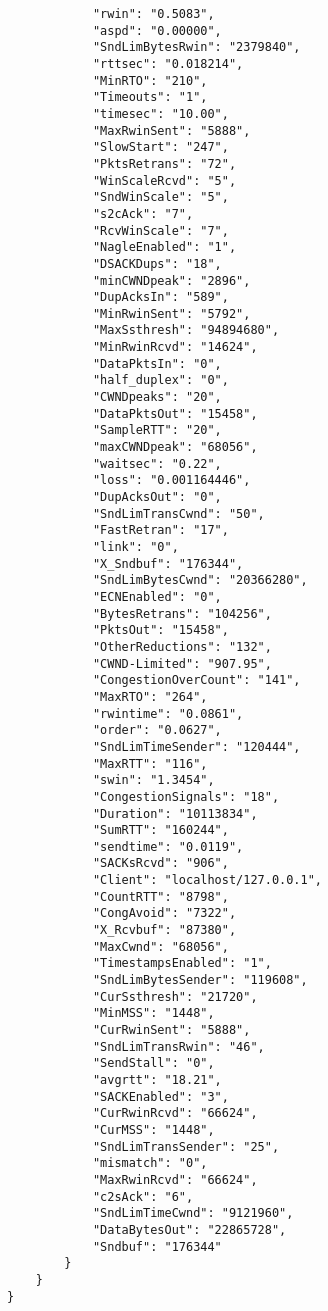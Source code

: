 \begin{verbatim}
            "rwin": "0.5083",
            "aspd": "0.00000",
            "SndLimBytesRwin": "2379840",
            "rttsec": "0.018214",
            "MinRTO": "210",
            "Timeouts": "1",
            "timesec": "10.00",
            "MaxRwinSent": "5888",
            "SlowStart": "247",
            "PktsRetrans": "72",
            "WinScaleRcvd": "5",
            "SndWinScale": "5",
            "s2cAck": "7",
            "RcvWinScale": "7",
            "NagleEnabled": "1",
            "DSACKDups": "18",
            "minCWNDpeak": "2896",
            "DupAcksIn": "589",
            "MinRwinSent": "5792",
            "MaxSsthresh": "94894680",
            "MinRwinRcvd": "14624",
            "DataPktsIn": "0",
            "half_duplex": "0",
            "CWNDpeaks": "20",
            "DataPktsOut": "15458",
            "SampleRTT": "20",
            "maxCWNDpeak": "68056",
            "waitsec": "0.22",
            "loss": "0.001164446",
            "DupAcksOut": "0",
            "SndLimTransCwnd": "50",
            "FastRetran": "17",
            "link": "0",
            "X_Sndbuf": "176344",
            "SndLimBytesCwnd": "20366280",
            "ECNEnabled": "0",
            "BytesRetrans": "104256",
            "PktsOut": "15458",
            "OtherReductions": "132",
            "CWND-Limited": "907.95",
            "CongestionOverCount": "141",
            "MaxRTO": "264",
            "rwintime": "0.0861",
            "order": "0.0627",
            "SndLimTimeSender": "120444",
            "MaxRTT": "116",
            "swin": "1.3454",
            "CongestionSignals": "18",
            "Duration": "10113834",
            "SumRTT": "160244",
            "sendtime": "0.0119",
            "SACKsRcvd": "906",
            "Client": "localhost/127.0.0.1",
            "CountRTT": "8798",
            "CongAvoid": "7322",
            "X_Rcvbuf": "87380",
            "MaxCwnd": "68056",
            "TimestampsEnabled": "1",
            "SndLimBytesSender": "119608",
            "CurSsthresh": "21720",
            "MinMSS": "1448",
            "CurRwinSent": "5888",
            "SndLimTransRwin": "46",
            "SendStall": "0",
            "avgrtt": "18.21",
            "SACKEnabled": "3",
            "CurRwinRcvd": "66624",
            "CurMSS": "1448",
            "SndLimTransSender": "25",
            "mismatch": "0",
            "MaxRwinRcvd": "66624",
            "c2sAck": "6",
            "SndLimTimeCwnd": "9121960",
            "DataBytesOut": "22865728",
            "Sndbuf": "176344"
        }
    }
}
\end{verbatim}
